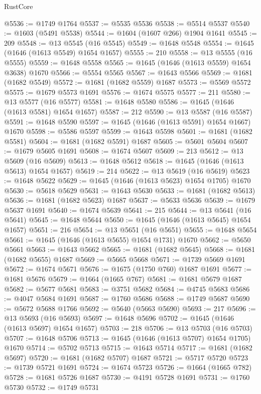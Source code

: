\begin{lexlean}{RustCore}
\begin{coremodule}
@5536 := @1749 @1764
@5537 := @5535 @5536
@5538 := @5514 @5537
@5540 := @1603 (@5491 @5538)
@5544 := @1604 (@1607 @266) @1904 @1641
@5545 := 209
@5548 := @13 @5545 (@16 @5545)
@5549 := @1648 @5548
@5554 := @1645 (@1646 (@1613 @5549) @1654 @1657)
@5555 := 210
@5558 := @13 @5555 (@16 @5555)
@5559 := @1648 @5558
@5565 := @1645 (@1646 (@1613 @5559) @1654 @3638) @1670
@5566 := @5554 @5565
@5567 := @1643 @5566
@5569 := @1681 (@1682 @5549)
@5572 := @1681 (@1682 @5559) @1687
@5573 := @5569 @5572
@5575 := @1679 @5573 @1691
@5576 := @1674 @5575
@5577 := 211
@5580 := @13 @5577 (@16 @5577)
@5581 := @1648 @5580
@5586 := @1645 (@1646 (@1613 @5581) @1654 @1657)
@5587 := 212
@5590 := @13 @5587 (@16 @5587)
@5591 := @1648 @5590
@5597 := @1645 (@1646 (@1613 @5591) @1654 @1667) @1670
@5598 := @5586 @5597
@5599 := @1643 @5598
@5601 := @1681 (@1682 @5581)
@5604 := @1681 (@1682 @5591) @1687
@5605 := @5601 @5604
@5607 := @1679 @5605 @1691
@5608 := @1674 @5607
@5609 := 213
@5612 := @13 @5609 (@16 @5609)
@5613 := @1648 @5612
@5618 := @1645 (@1646 (@1613 @5613) @1654 @1657)
@5619 := 214
@5622 := @13 @5619 (@16 @5619)
@5623 := @1648 @5622
@5629 := @1645 (@1646 (@1613 @5623) @1654 @1705) @1670
@5630 := @5618 @5629
@5631 := @1643 @5630
@5633 := @1681 (@1682 @5613)
@5636 := @1681 (@1682 @5623) @1687
@5637 := @5633 @5636
@5639 := @1679 @5637 @1691
@5640 := @1674 @5639
@5641 := 215
@5644 := @13 @5641 (@16 @5641)
@5645 := @1648 @5644
@5650 := @1645 (@1646 (@1613 @5645) @1654 @1657)
@5651 := 216
@5654 := @13 @5651 (@16 @5651)
@5655 := @1648 @5654
@5661 := @1645 (@1646 (@1613 @5655) @1654 @1731) @1670
@5662 := @5650 @5661
@5663 := @1643 @5662
@5665 := @1681 (@1682 @5645)
@5668 := @1681 (@1682 @5655) @1687
@5669 := @5665 @5668
@5671 := @1739 @5669 @1691
@5672 := @1674 @5671
@5676 := @1675 (@1750 @760) @1687 @1691
@5677 := @1681 @5676
@5679 := @1664 (@1665 @767)
@5681 := @1681 @5679 @1687
@5682 := @5677 @5681
@5683 := @3751 @5682
@5684 := @4745 @5683
@5686 := @4047 @5684 @1691
@5687 := @1760 @5686
@5688 := @1749 @5687
@5690 := @5672 @5688 @1766
@5692 := @5640 (@5663 @5690)
@5693 := 217
@5696 := @13 @5693 (@16 @5693)
@5697 := @1648 @5696
@5702 := @1645 (@1646 (@1613 @5697) @1654 @1657)
@5703 := 218
@5706 := @13 @5703 (@16 @5703)
@5707 := @1648 @5706
@5713 := @1645 (@1646 (@1613 @5707) @1654 @1705) @1670
@5714 := @5702 @5713
@5715 := @1643 @5714
@5717 := @1681 (@1682 @5697)
@5720 := @1681 (@1682 @5707) @1687
@5721 := @5717 @5720
@5723 := @1739 @5721 @1691
@5724 := @1674 @5723
@5726 := @1664 (@1665 @782)
@5728 := @1681 @5726 @1687
@5730 := @4191 @5728 @1691
@5731 := @1760 @5730
@5732 := @1749 @5731

\end{coremodule}
\end{lexlean}
